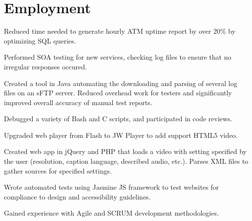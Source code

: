 \documentclass[]{deedy-resume-openfont}
\begin{document}
\begin{minipage}[t]{0.66\textwidth} 


\section{Employment}

\vspace{\topsep} %
\begin{tightemize}
\item Reduced time needed to generate hourly ATM uptime report by over 20\% by optimizing SQL queries.   
\item Performed SOA testing for new services, checking log files to ensure that no irregular responses occured.
\item Created a tool in Java automating the downloading and parsing of several log files on an sFTP server. Reduced overhead work for testers and significantly improved overall accuracy of manual test reports. %
\item Debugged a variety of Bash and C scripts, and participated in code reviews.
\end{tightemize}
\sectionsep

\begin{tightemize}
\item Upgraded web player from Flash to JW Player to add support HTML5 video.
\item Created web app in jQuery and PHP that loads a video with setting specified by the user (resolution, caption language, described audio, etc.). Parses XML files to gather sources for specified settings.
\item Wrote automated tests using Jasmine JS framework to test websites for compliance to design and accessibility guidelines.
\item Gained experience with Agile and SCRUM development methodologies.
\end{tightemize}
\sectionsep


\end{minipage}
\end{document}
